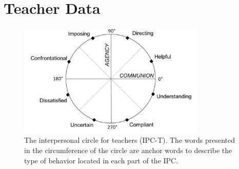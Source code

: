 \documentclass[man]{apa6}
\begin{document}
\section{Teacher Data}\label{Example}

\begin{figure}
\centering
\includegraphics[width = 0.8\textwidth]{Plots/IPC-T.png}
\caption{The interpersonal circle for teachers (IPC-T). The words presented in
the circumference of the circle are anchor words to describe the type of
behavior located in each part of the IPC.}
\label{QTI}
\end{figure}
\end{document}
